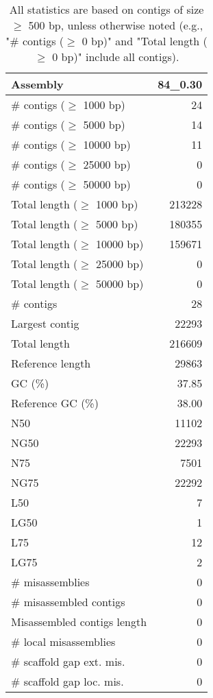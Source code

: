 \documentclass[12pt,a4paper]{article}
\begin{document}
\begin{table}[ht]
\begin{center}
\caption{All statistics are based on contigs of size $\geq$ 500 bp, unless otherwise noted (e.g., "\# contigs ($\geq$ 0 bp)" and "Total length ($\geq$ 0 bp)" include all contigs).}
\begin{tabular}{|l*{1}{|r}|}
\hline
Assembly & 84\_0.30 \\ \hline
\# contigs ($\geq$ 1000 bp) & 24 \\ \hline
\# contigs ($\geq$ 5000 bp) & 14 \\ \hline
\# contigs ($\geq$ 10000 bp) & 11 \\ \hline
\# contigs ($\geq$ 25000 bp) & 0 \\ \hline
\# contigs ($\geq$ 50000 bp) & 0 \\ \hline
Total length ($\geq$ 1000 bp) & 213228 \\ \hline
Total length ($\geq$ 5000 bp) & 180355 \\ \hline
Total length ($\geq$ 10000 bp) & 159671 \\ \hline
Total length ($\geq$ 25000 bp) & 0 \\ \hline
Total length ($\geq$ 50000 bp) & 0 \\ \hline
\# contigs & 28 \\ \hline
Largest contig & 22293 \\ \hline
Total length & 216609 \\ \hline
Reference length & 29863 \\ \hline
GC (\%) & 37.85 \\ \hline
Reference GC (\%) & 38.00 \\ \hline
N50 & 11102 \\ \hline
NG50 & 22293 \\ \hline
N75 & 7501 \\ \hline
NG75 & 22292 \\ \hline
L50 & 7 \\ \hline
LG50 & 1 \\ \hline
L75 & 12 \\ \hline
LG75 & 2 \\ \hline
\# misassemblies & 0 \\ \hline
\# misassembled contigs & 0 \\ \hline
Misassembled contigs length & 0 \\ \hline
\# local misassemblies & 0 \\ \hline
\# scaffold gap ext. mis. & 0 \\ \hline
\# scaffold gap loc. mis. & 0 \\ \hline

\end{tabular}
\end{center}
\end{table}
\end{document}
